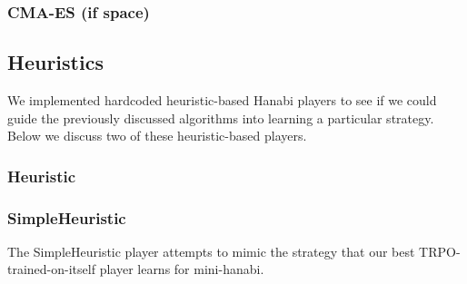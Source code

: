 \subsubsection{CMA-ES (if space)}

\subsection{Heuristics}

We implemented hardcoded heuristic-based Hanabi players to see if we could
guide the previously discussed algorithms into learning a particular strategy.
Below we discuss two of these heuristic-based players.

\subsubsection{Heuristic}
\subsubsection{SimpleHeuristic}

The SimpleHeuristic player attempts to mimic the strategy that our best
TRPO-trained-on-itself player learns for mini-hanabi.

